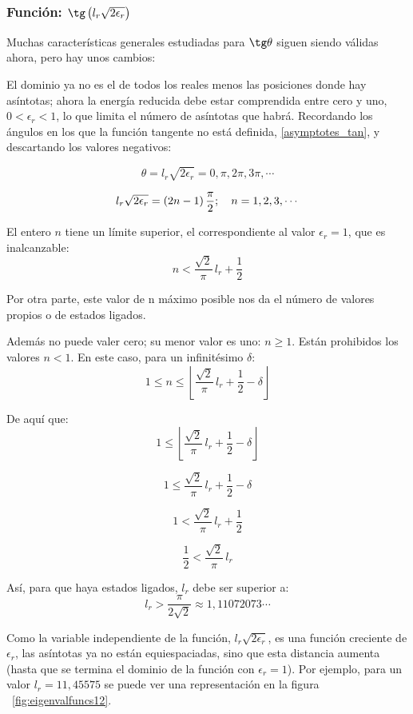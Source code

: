\subsubsection{Función: $\tg\left(l_r\sqrt{2\epsilon_r}\right)$}
Muchas características generales estudiadas para $\tg\theta$ siguen siendo
válidas ahora, pero hay unos cambios:

El dominio ya no es el de todos los reales menos las posiciones donde hay
asíntotas; ahora la energía reducida debe estar comprendida entre cero y uno,
$0<\epsilon_r<1$, lo que limita el número de asíntotas que habrá.
Recordando los ángulos en los que la función tangente no está definida,
\ref{asymptotes_tan}, y descartando los valores negativos:

\[
\theta=l_r\sqrt{2\epsilon_r}=0,\pi,2\pi,3\pi,\cdots
\]

\[
l_r\sqrt{2\epsilon_r}=(2n-1)\,\frac{\pi}{2}
;\hspace*{1em}
n=1,2,3,\cdots
\]

El entero $n$ tiene un límite superior, el correspondiente al valor
$\epsilon_r=1$, que es inalcanzable:
\begin{equation}
\label{n_limsup}
n < \frac{\sqrt{2}}{\pi}\,l_r + \frac{1}{2}
\end{equation}

Por otra parte, este valor de n máximo posible nos da el número de valores
propios o de estados ligados.

Además no puede valer cero; su menor valor es uno: $n\ge 1$. Están
prohibidos los valores $n<1$. En este caso, para un infinitésimo $\delta$:
\[
1\le n\le\left\lfloor \frac{\sqrt{2}}{\pi}\,l_r+\frac{1}{2}-\delta\right\rfloor
\]

De aquí que:
\[
1 \le \left\lfloor\frac{\sqrt{2}}{\pi}\,l_r+\frac{1}{2}-\delta\right\rfloor
\]

\[
1 \le \frac{\sqrt{2}}{\pi}\,l_r+\frac{1}{2}-\delta
\]

\[
1 < \frac{\sqrt{2}}{\pi}\,l_r+\frac{1}{2}
\]

\[
\frac{1}{2} < \frac{\sqrt{2}}{\pi}\,l_r
\]

Así, para que haya estados ligados, $l_r$ debe ser superior a:
\[
l_r > \frac{\pi}{2\sqrt{2}} \approx 1,11072073\cdots
\]

Como la variable independiente de la función, $l_r\sqrt{2\epsilon_r}$,
es una función creciente de $\epsilon_r$, las asíntotas ya no están
equiespaciadas, sino que esta distancia aumenta (hasta que se termina el
dominio de la función con $\epsilon_r=1$). Por ejemplo, para un
valor $l_r=11,45575$ se puede ver una representación en la figura
~\ref{fig:eigenvalfuncs12}.

